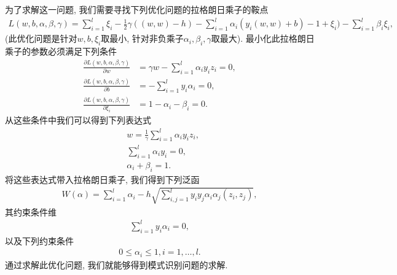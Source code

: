 为了求解这一问题, 我们需要寻找下列优化问题的拉格朗日乘子的鞍点
\begin{align}
L(w,b,\alpha,\beta,\gamma) = \sum_{i=1}^{l}\xi_{i}
- \frac{1}{2}\gamma((w,w) - h)
- \sum_{i=1}^{l}\alpha_{i}(y_{i}(w,w)+b)-1 + \xi_{i})
- \sum_{i=1}^{l}\beta_{i}\xi_{i},
\end{align}
(此优化问题是针对$w,b,\xi_{i}$取最小, 针对非负乘子$\alpha_{i},\beta_{i},\gamma$取最大). 最小化此拉格朗日乘子的参数必须满足下列条件
\begin{align*}
\frac{\partial L(w,b,\alpha,\beta,\gamma)}{\partial w} &= \gamma w - \sum_{i=1}^{l}\alpha_{i}y_{i}z_{i} = 0,\\
\frac{\partial L(w,b,\alpha,\beta,\gamma)}{\partial b} &= -\sum_{i=1}^{l}y_{i}\alpha_{i} = 0,\\
\frac{\partial L(w,b,\alpha,\beta,\gamma)}{\partial \xi_i} &= 1 - \alpha_{i} - \beta_{i} = 0.
\end{align*}
从这些条件中我们可以得到下列表达式
\begin{align}
&w = \frac{1}{\gamma}\sum_{i=1}^{l}\alpha_{i}y_{i}z_{i},\\
&\sum_{i=1}^{l}\alpha_{i}y_{i} = 0,\\
&\alpha_{i} + \beta_{i} = 1.
\end{align}
将这些表达式带入拉格朗日乘子, 我们得到下列泛函
\begin{align}
W(\alpha) = \sum_{i=1}^{l}\alpha_{i} - h\sqrt{\sum_{i,j=1}^{l}y_{i}y_{j}\alpha_{i}\alpha_{j}(z_{i},z_{j})},
\end{align}
其约束条件维
\begin{align}
\sum_{i=1}^{l}y_{i}\alpha_{i} = 0,
\end{align}
以及下列约束条件
\begin{align*}
0 \leq \alpha_{i} \leq 1, i=1,\ldots,l.
\end{align*}
通过求解此优化问题, 我们就能够得到模式识别问题的求解.

